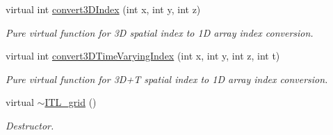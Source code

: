 \begin{DoxyCompactItemize}
virtual int \hyperlink{classITL__grid_a2a1731cce0351121768b5a104e601057}{convert3DIndex} (int x, int y, int z)
\begin{DoxyCompactList}\small\item\em Pure virtual function for 3D spatial index to 1D array index conversion. \item\end{DoxyCompactList}\item 
virtual int \hyperlink{classITL__grid_ab43a701a19db72eafd919763f9092a74}{convert3DTimeVaryingIndex} (int x, int y, int z, int t)
\begin{DoxyCompactList}\small\item\em Pure virtual function for 3D+T spatial index to 1D array index conversion. \item\end{DoxyCompactList}\item 
virtual \hyperlink{classITL__grid_a44d1b2ed1e6e15cbf4067468b7b9fa96}{$\sim$ITL\_\-grid} ()
\begin{DoxyCompactList}\small\item\em Destructor. \item\end{DoxyCompactList}\end{DoxyCompactItemize}
